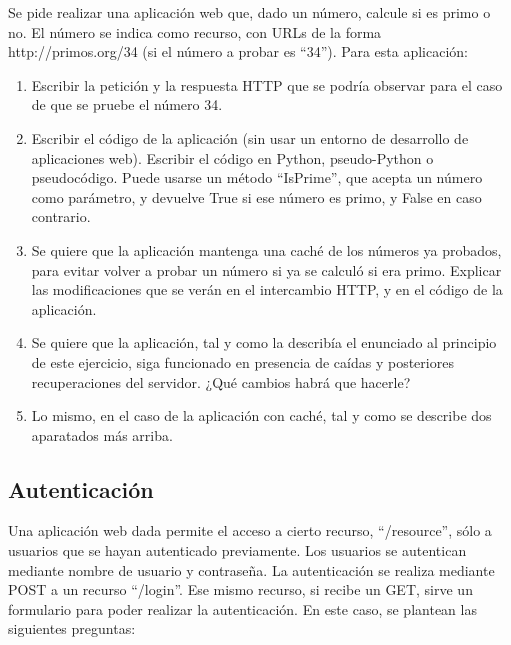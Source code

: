 {Se pide realizar una aplicación web que, dado un número, calcule si es primo o no. El número se indica como recurso, con URLs de la forma http://primos.org/34 (si el número a probar es ``34''). Para esta aplicación:

\begin{enumerate}
\item Escribir la petición y la respuesta HTTP que se podría observar para el caso de que se pruebe el número 34.
\item Escribir el código de la aplicación (sin usar un entorno de desarrollo de aplicaciones web). Escribir el código en Python, pseudo-Python o pseudocódigo. Puede usarse un método ``IsPrime'', que acepta un número como parámetro, y devuelve True si ese número es primo, y False en caso contrario.
\item Se quiere que la aplicación mantenga una caché de los números ya probados, para evitar volver a probar un número si ya se calculó si era primo. Explicar las modificaciones que se verán en el intercambio HTTP, y en el código de la aplicación.
\item Se quiere que la aplicación, tal y como la describía el enunciado al principio de este ejercicio, siga funcionado en presencia de caídas y posteriores recuperaciones del servidor. ¿Qué cambios habrá que hacerle?
\item Lo mismo, en el caso de la aplicación con caché, tal y como se describe dos aparatados más arriba.
\end{enumerate}

\subsection{Autenticación}

Una aplicación web dada permite el acceso a cierto recurso, ``/resource'', sólo a usuarios que se hayan autenticado previamente. Los usuarios se autentican mediante nombre de usuario y contraseña. La autenticación se realiza mediante POST a un recurso ``/login''. Ese mismo recurso, si recibe un GET, sirve un formulario para poder realizar la autenticación. En este caso, se plantean las siguientes preguntas:

}
